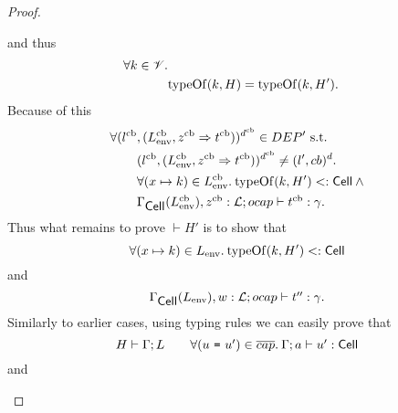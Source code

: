 \begin{proof}
\begin{description}
\begin{description}
\begin{description}
              and thus
              \begin{equation}
                \begin{aligned}
                  \forall k \in \mathscr{V} . \\
                    &\mbox{$\mathrm{typeOf}$}(k, H) = \mbox{$\mathrm{typeOf}$}(k, H').
                \end{aligned}
              \end{equation}
              Because of this
              \begin{equation}
                \begin{aligned}
                  \forall (l^{\text{cb}}&, (L^{\text{cb}}_{\text{env}},
                  z^{\text{cb}} \Rightarrow t^{\text{cb}}))^{d^{\text{cb}}} \in
                  DEP' \text{ s.t. }  \\
                  &(l^{\text{cb}}, (L^{\text{cb}}_{\text{env}}, z^{\text{cb}}
                  \Rightarrow t^{\text{cb}}))^{d^{\text{cb}}} \neq
                  (l', cb)^d. \\
                  &\forall (x \mapsto k) \in L^{\text{cb}}_{\text{env}}.\: \mbox{$\mathrm{typeOf}$}{(k, H')} <:
                  \mbox{$\mathsf{Cell}$} \: \land \\
                  &\mbox{$\Gamma_{\mbox{$\mathsf{Cell}$}{}}(L^{\text{cb}}_{\text{env}}), z^{\text{cb}}:
                  \mbox{$\mathcal{L}$};\mbox{$ocap$}\vdash t^{\text{cb}}:\gamma$}.
                \end{aligned}
              \end{equation}
              Thus what remains to prove $\vdash H'$ is to show that
              \begin{equation} \label{eq:ewhen-h1}
                \forall (x \mapsto k) \in L_{\text{env}}.\: \mbox{$\mathrm{typeOf}$}{(k, H')} <:
                \mbox{$\mathsf{Cell}$}
              \end{equation}
              and
              \begin{equation} \label{eq:ewhen-h2}
                \mbox{$\Gamma_{\mbox{$\mathsf{Cell}$}{}}(L_{\text{env}}), w:
                \mbox{$\mathcal{L}$};\mbox{$ocap$}\vdash t'':\gamma$}.
              \end{equation}
              Similarly to earlier cases, using typing rules we can easily prove
              that
              \begin{equation}\label{eq:ewhen-h3}
                H \vdash \Gamma; L \quad\quad \forall (\mbox{\mdseries$u$~\texttt{=}~$u'$}) \in
                \overline{cap}. \: \mbox{$\Gamma;a\vdash u':\mbox{$\mathsf{Cell}$}$} 
              \end{equation}
              and
              \begin{equation} \label{eq:ewhen-h4}

\end{equation}
\end{description}
\end{description}
\end{description}
\end{proof}

